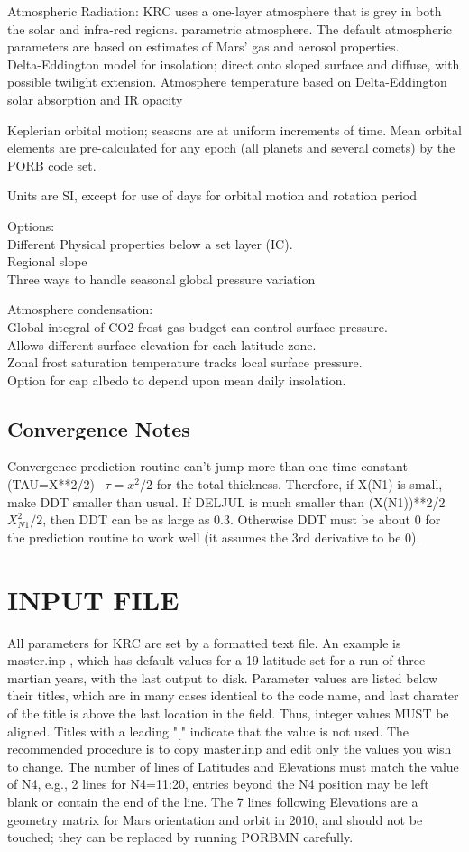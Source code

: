 \documentclass[draft]{article}  %
\newcommand{\qi}{\\ \hspace*{2.em}}      %
\newcommand{\qii}{\\ \hspace*{4.em}}     %
\begin{document}
Atmospheric Radiation: KRC uses a one-layer atmosphere that is grey in both the
solar and infra-red regions. parametric atmosphere. The default atmospheric
parameters are based on estimates of Mars' gas and aerosol properties.
\qi  Delta-Eddington model for insolation; direct onto sloped surface and diffuse,
with possible twilight extension.
  Atmosphere temperature based on Delta-Eddington solar absorption and IR opacity

Keplerian orbital motion; seasons are at uniform increments of time. Mean 
orbital elements are pre-calculated for any epoch (all planets and several
comets) by the PORB code set.

Units are SI, except for use of days for orbital motion and rotation period 

Options:
\qi  Different Physical properties below a set layer (IC).
\qi  Regional slope
\qi  Three ways to handle seasonal global pressure variation

Atmosphere condensation: 
\qi Global integral of CO2 frost-gas budget can control surface pressure.
\qi Allows different surface elevation for each latitude zone.
\qii  Zonal frost saturation temperature tracks local surface pressure.
\qi Option for cap albedo to depend upon mean daily insolation.

\subsection{Convergence Notes} %

Convergence prediction routine can't jump more than one time constant
(TAU=X**2/2) \ $\tau =x^2/2$ for the total thickness.  Therefore, if X(N1) is
small, make DDT smaller than usual.  If DELJUL is much smaller than (X(N1))**2/2
\ $X_{N1}^2/2$, then DDT can be as large as 0.3.  Otherwise DDT must be about 0
for the prediction routine to work well (it assumes the 3rd derivative to be 0).

\section{INPUT FILE}

All parameters for KRC are set by a formatted text file.  An example is
master.inp , which has default values for a 19 latitude set for a run of three
martian years, with the last output to disk. Parameter values are listed below
their titles, which are in many cases identical to the code name, and last
charater of the title is above the last location in the field. Thus, integer
values MUST be aligned. Titles with a leading "[" indicate that the value is not
used. The recommended procedure is to copy master.inp and edit only the values
you wish to change. The number of lines of Latitudes and Elevations must match
the value of N4, e.g., 2 lines for N4=11:20, entries beyond the N4 position may
be left blank or contain the end of the line. The 7 lines following Elevations
are a geometry matrix for Mars orientation and orbit in 2010, and should not be
touched; they can be replaced by running PORBMN carefully.
\end{document}
